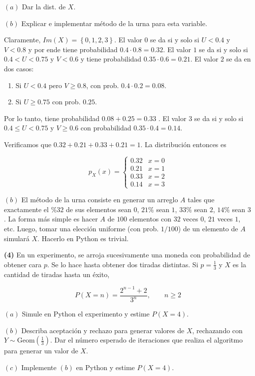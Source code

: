 \documentclass[a4paper, 12pt]{article}
\begin{document}
\begin{myframe}
  $(a)$ Dar la dist. de $X$. 

  $(b)$ Explicar e implementar método de la urna para esta variable.
\end{myframe}

Claramente, $Im(X) = \left\{ 0, 1, 2, 3 \right\} $. El valor $0$ se da si y solo
si $U < 0.4$ y $V < 0.8$ y por ende tiene probabilidad $0.4 \cdot 0.8 = 0.32$. 
El valor $1$ se da si y solo si $0.4 < U < 0.75$ y $V < 0.6$ y tiene probabilidad
$0.35 \cdot 0.6 = 0.21$. El valor $2$ se da en dos casos:

\begin{enumerate}
  \item Si $U < 0.4$ pero $V \geq 0.8$, con prob. $0.4 \cdot 0.2 = 0.08$.
  \item Si $U \geq 0.75$ con prob. $0.25$.
\end{enumerate}

Por lo tanto, tiene probabilidad $0.08 + 0.25 = 0.33$ . El valor $3$ se da si y
solo si $0.4 \leq U < 0.75$ y $V \geq 0.6$ con probabilidad $0.35 \cdot 0.4 =
0.14$.

Verificamos que $0.32 + 0.21 + 0.33 + 0.21 = 1$. La distribución entonces es 

\begin{equation*}
  p_X(x) = \begin{cases}
    0.32 & x = 0 \\ 
    0.21 & x = 1 \\ 
    0.33 & x = 2 \\ 
    0.14 & x = 3
  \end{cases}
\end{equation*}

$(b)$ El método de la urna consiste en generar un arreglo $A$ tales que
exactamente el $\%32$ de sus elementos sean $0$, $21\%$ sean $1$, $33\%$ sean
$2$, $14\%$ sean $3$. La forma más simple es hacer $A$ de $100$ elementos con 
$32$ veces $0$, $21$ veces $1$, etc. Luego, tomar una elección uniforme (con
prob. $1 / 100$) de un elemento de $A$ simulará $X$. Hacerlo en Python es
trivial.

\pagebreak 

\begin{myframe}
  \textbf{(4)} En un experimento, se arroja sucesivamente una moneda con
  probabilidad de obtener cara $p$. Se lo hace hasta obtener dos tiradas
  distintas. Si $p = \frac{1}{3}$ y $X$ es la cantidad de tiradas hasta un
  éxito,

  \begin{equation*}
    P(X = n) = \frac{2^{n-1} + 2}{3^n}, \qquad n \geq 2
  \end{equation*}

  $(a)$ Simule en Python el experimento y estime $P(X = 4)$. 

  $(b)$ Describa aceptación y rechazo para generar valores de $X$, rechazando
  con $Y \sim \text{Geom}(\frac{1}{3})$. Dar el número esperado de iteraciones
  que realiza el algoritmo para generar un valor de $X$.

  $(c)$ Implemente $(b)$ en Python y estime $P(X = 4)$.
\end{myframe}
\end{document}
